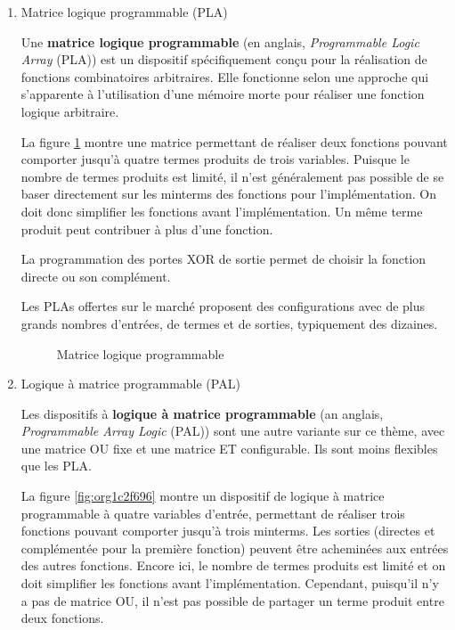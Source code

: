 \documentclass[letter, oneside]{book}
\begin{document}
\begin{enumerate}
\item Matrice logique programmable (PLA)
\label{sec:orgf47b821}

Une \textbf{matrice logique programmable} (en anglais, \emph{Programmable Logic
Array} (PLA)) est un dispositif spécifiquement conçu pour la
réalisation de fonctions combinatoires arbitraires. Elle fonctionne
selon une approche qui s'apparente à l'utilisation d'une mémoire morte
pour réaliser une fonction logique arbitraire.

La figure \ref{fig:org768f212} montre une matrice permettant de
réaliser deux fonctions pouvant comporter jusqu'à quatre termes
produits de trois variables. Puisque le nombre de termes produits est
limité, il n'est généralement pas possible de se baser directement sur
les minterms des fonctions pour l'implémentation. On doit donc
simplifier les fonctions avant l'implémentation. Un même terme produit
peut contribuer à plus d'une fonction.

La programmation des portes XOR de sortie permet de choisir
la fonction directe ou son complément. 

Les PLAs offertes sur le marché proposent des configurations avec de
plus grands nombres d'entrées, de termes et de sorties, typiquement
des dizaines.

\begin{figure}[htbp]
\centering

\caption{\label{fig:org768f212}Matrice logique programmable}
\end{figure}

\item Logique à matrice programmable (PAL)
\label{sec:org7c06b12}

Les dispositifs à \textbf{logique à matrice programmable} (an anglais,
\emph{Programmable Array Logic} (PAL)) sont une autre variante sur ce
thème, avec une matrice OU fixe et une matrice ET configurable. Ils
sont moins flexibles que les PLA.

La figure \ref{fig:org1c2f696} montre un dispositif de logique à matrice
programmable à quatre variables d'entrée, permettant de réaliser trois
fonctions pouvant comporter jusqu'à trois minterms. Les sorties
(directes et complémentée pour la première fonction) peuvent être
acheminées aux entrées des autres fonctions. Encore ici, le nombre de
termes produits est limité et on doit simplifier les fonctions avant
l'implémentation. Cependant, puisqu'il n'y a pas de matrice OU, il
n'est pas possible de partager un terme produit entre deux fonctions.


\end{enumerate}
\end{document}
